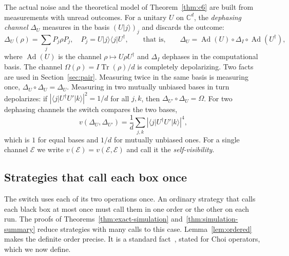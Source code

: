 \documentclass[11pt,letterpaper]{article}
\theoremstyle{definition}\newtheorem{definition}[theorem]{Definition}
\newcommand{\C}{\mathbb C}
\newcommand{\Tr}{\operatorname{Tr}}
\newcommand{\Ad}{\operatorname{Ad}}
\newcommand{\ket}[1]{\lvert#1\rangle}
\newcommand{\bra}[1]{\langle#1\rvert}
\newcommand{\proj}[1]{\ket{#1}\!\bra{#1}}
\begin{document}
The actual noise and the theoretical model of Theorem~\ref{thm:c6} are
built from measurements with unread outcomes.
For a unitary $U$ on $\C^d$, the \emph{dephasing channel} $\Delta_U$
measures in the basis $(U\ket j)_{j}$ and discards the outcome:
\begin{equation}\label{eq:conjugation}
 \Delta_U(\rho)=\sum_jP_j\rho P_j,\quad P_j=U\proj jU^\dagger,
 \qquad\text{that is,}\qquad
 \Delta_U=\Ad(U)\circ\Delta_I\circ\Ad(U^\dagger),
\end{equation}
where $\Ad(U)$ is the channel $\rho\mapsto U\rho U^\dagger$ and
$\Delta_I$ dephases in the computational basis. The channel
$\Omega(\rho)=I\Tr(\rho)/d$ is completely depolarizing. Two facts are
used in Section~\ref{sec:pair}. Measuring twice in the same basis is measuring once,
$\Delta_U\circ\Delta_U=\Delta_U$. Measuring in two mutually unbiased
bases in turn depolarizes: if $|\bra jU^\dagger U'\ket k|^2=1/d$ for
all $j,k$, then $\Delta_{U'}\circ\Delta_U=\Omega$. For two
dephasing channels the switch compares the two bases,
\begin{equation}\label{eq:basis-visibility}
 v(\Delta_U,\Delta_{U'})
 =\frac1d\sum_{j,k}|\bra jU^\dagger U'\ket k|^4 ,
\end{equation}
which is $1$ for equal bases and $1/d$ for mutually unbiased ones. For
a single channel $\mathcal E$ we write
$v(\mathcal E)=v(\mathcal E,\mathcal E)$ and call it the
\emph{self-visibility}.


\subsection{Strategies that call each box once}\label{sec:ordered}

The switch uses each of its two operations once. An ordinary strategy
that calls each black box at most once must call them in one order or
the other on each run. The proofs of Theorems~\ref{thm:exact-simulation}
and~\ref{thm:simulation-summary} reduce strategies with many calls to
this case. Lemma~\ref{lem:ordered} makes the definite order
precise. It is a standard fact~\cite{wechs2021}, stated for Choi
operators, which we now define.
\end{document}
